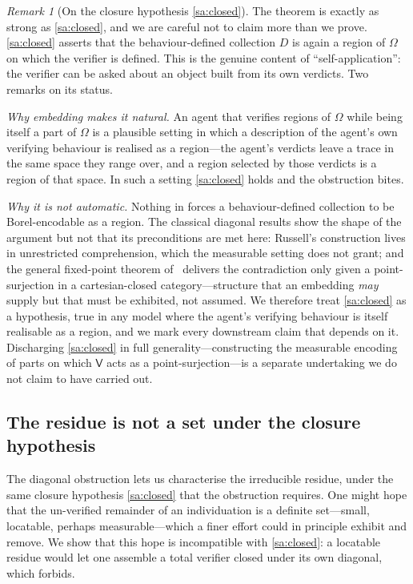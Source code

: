 \documentclass[11pt,a4paper]{article}
\theoremstyle{thmstyle}
\theoremstyle{definition}
\theoremstyle{remark}
\newtheorem{remark}[theorem]{Remark}
\newcommand{\Space}{\Omega}
\newcommand{\Ver}{\mathsf{V}}
\begin{document}
\begin{remark}[On the closure hypothesis \ref{sa:closed}]
\label{rem:self-app}
The theorem is exactly as strong as \ref{sa:closed}, and we are careful not to
claim more than we prove. \ref{sa:closed} asserts that the behaviour-defined
collection $D$ is again a region of $\Space$ on which the verifier is defined.
This is the genuine content of ``self-application'': the verifier can be asked
about an object built from its own verdicts. Two remarks on its status.

\emph{Why embedding makes it natural.} An agent that verifies regions of $\Space$
while being itself a part of $\Space$ is a plausible setting in which a
description of the agent's own verifying behaviour is realised as a region---the
agent's verdicts leave a trace in the same space they range over, and a region
selected by those verdicts is a region of that space. In such a setting
\ref{sa:closed} holds and the obstruction bites.

\emph{Why it is not automatic.} Nothing in  forces a
behaviour-defined collection to be Borel-encodable as a region. The classical
diagonal results show the shape of the argument but not that its preconditions are
met here: Russell's construction lives in unrestricted comprehension, which the
measurable setting does not grant; and the general fixed-point
theorem of~\citet{lawvere1969} delivers the contradiction only given a
point-surjection in a cartesian-closed category---structure that an embedding
\emph{may} supply but that must be exhibited, not assumed. We therefore treat
\ref{sa:closed} as a hypothesis, true in any model where the agent's verifying
behaviour is itself realisable as a region, and we mark every downstream claim
that depends on it. Discharging \ref{sa:closed} in full generality---constructing
the measurable encoding of parts on which $\Ver$ acts as a point-surjection---is a
separate undertaking we do not claim to have carried out.
\end{remark}

\subsection{The residue is not a set under the closure hypothesis}

The diagonal obstruction lets us characterise the irreducible residue, under the
same closure hypothesis \ref{sa:closed} that the obstruction requires. One might
hope that the un-verified remainder of an individuation is a definite set---small,
locatable, perhaps measurable---which a finer effort could in principle exhibit
and remove. We show that this hope is incompatible with \ref{sa:closed}: a
locatable residue would let one assemble a total verifier closed under its own
diagonal, which  forbids.
\end{document}
